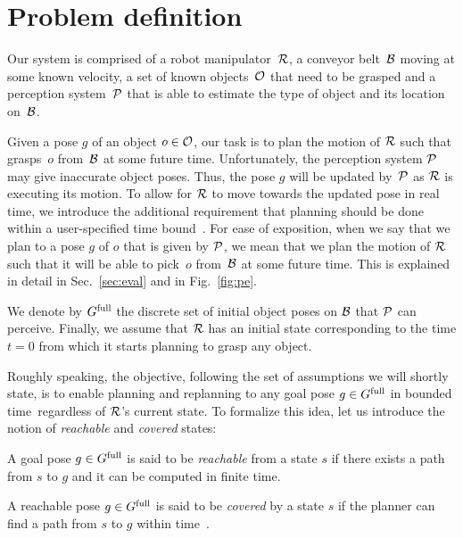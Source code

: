 \documentclass[conference]{IEEEtran}
\begin{document}
\section{Problem definition}
Our system is comprised of 
a robot manipulator~$\mathcal{R}$,
a conveyor belt~$\mathcal{B}$ moving at some known velocity,
a set of known objects~$\mathcal{O}$ that need to be grasped and 
a perception system~$\mathcal{P}$ that is able to estimate the type of object and its location on~$\mathcal{B}$.

Given a pose $g$ of an object $o \in \mathcal{O}$, our task is to plan the motion of $\mathcal{R}$ such that grasps~$o$ from~$\mathcal{B}$ at some future time.
%
Unfortunately, the perception system $\mathcal{P}$ may give inaccurate object poses.
Thus, the pose $g$ will be updated by~$\mathcal{P}$ as $\mathcal{R}$ is executing its motion. 
To allow for $\mathcal{R}$ to move towards the updated pose in real time, we introduce the additional requirement that planning should be done within a user-specified time bound~\Tbound.
%
For ease of exposition, when we say that we plan to a pose $g$ of $o$ that is given by $\mathcal{P}$, 
we mean that we plan the motion of $\mathcal{R}$ such that it will be able to pick~$o$ from~$\mathcal{B}$ at some future time. 
This is explained in detail in Sec.~\ref{sec:eval} and in Fig.~\ref{fig:pe}.

%
We denote by $G^{\textrm{full}}$ the discrete set of initial object poses on $\mathcal{B}$ that $\mathcal{P}$ can perceive.
%
Finally, we assume that $\mathcal{R}$ has an initial state \Shome corresponding to the time $t=0$ from which it starts planning to grasp any object.


Roughly speaking, the objective, following the set of assumptions we will shortly state, is to enable planning and replanning to any goal pose $ g \in G^{\textrm{full}}$ in bounded time~\Tbound regardless of $\mathcal{R}$'s current state.
To formalize this idea, let us introduce the notion of \emph{reachable} and \emph{covered} states:

\vspace{2mm}
\begin{definition}
    A goal pose $g \in G^{\textrm{full}}$ is said to be \emph{reachable} from a state $s$ if there exists a path from $s$ to $g$ and it can be computed in finite time.
\end{definition}

\vspace{2mm}
\begin{definition}
    A reachable pose $g \in G^{\textrm{full}}$ is said to be \emph{covered} by a state $s$ if 
    the planner can find a path from $s$ to $g$ within time~\Tbound.
\end{definition}
\end{document}
